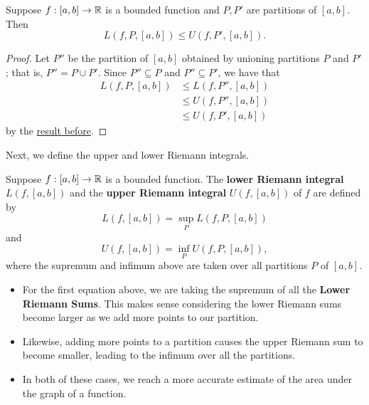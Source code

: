 \documentclass[11pt,a4paper]{book}
\begin{document}
\begin{prop}
    Suppose \( f: [a,b] \to \mathbb{R}  \) is a bounded function and \( P, P' \) are partitions of \( [a,b] \). Then 
    \[  L(f,P,[a,b]) \leq U(f,P', [a,b]). \]
\end{prop}

\begin{proof}
    Let \( P''  \) be the partition of \( [a,b] \) obtained by unioning partitions \(  P   \) and \( P' \); that is, \( P'' = P \cup P' \). Since \( P'' \subseteq P  \) and \( P'' \subseteq  P' \), we have that 
    \begin{align*}
        L(f, P, [a,b]) &\leq L(f, P'', [a,b]) \\
                       &\leq U(f, P'', [a,b]) \\
                       &\leq U(f, P', [a,b])
    \end{align*}
    by the {\hyperref[Inequalities with Riemann Sums]{result before}}.  
    \end{proof}

Next, we define the upper and lower Riemann integrals.

\begin{definition}
    Suppose \( f: [a,b] \to \mathbb{R}  \) is a bounded function. The \textbf{lower Riemann integral} \( L(f,[a,b]) \) and the \textbf{upper Riemann integral} \( U(f,[a,b]) \) of \( f \) are defined by 
    \[ L(f,[a,b]) = \sup_{P} L(f,P,[a,b])     \]
    and
    \[  U(f,[a,b]) = \inf_{P} U(f, P, [a,b]),  \]
    where the supremum and infimum above are taken over all partitions \( P  \) of \( [a,b] \).
\end{definition}

\begin{itemize}
    \item For the first equation above, we are taking the supremum of all the \textbf{Lower Riemann Sums}. This makes sense considering the lower Riemann sums become larger as we add more points to our partition. 
    \item Likewise, adding more points to a partition causes the upper Riemann sum to become smaller, leading to the infimum over all the partitions. 
    \item In both of these cases, we reach a more accurate estimate of the area under the graph of a function.
\end{itemize}
\end{document}
